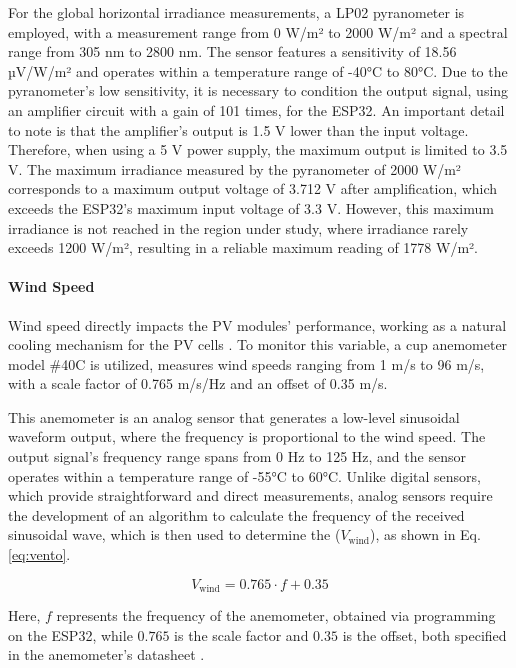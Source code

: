 \documentclass{ieeeaccess}
\begin{document}
For the global horizontal irradiance measurements, a LP02 pyranometer is employed, with a measurement range from 0 W/m² to 2000 W/m² and a spectral range from 305 nm to 2800 nm. The sensor features a sensitivity of 18.56 µV/W/m² and operates within a temperature range of -40°C to 80°C. Due to the pyranometer's low sensitivity, it is necessary to condition the output signal, using an amplifier circuit with a gain of 101 times, for the ESP32.
%
An important detail to note is that the amplifier's output is 1.5 V lower than the input voltage. Therefore, when using a 5 V power supply, the maximum output is limited to 3.5 V. The maximum irradiance measured by the pyranometer of 2000 W/m² corresponds to a maximum output voltage of 3.712 V after amplification, which exceeds the ESP32’s maximum input voltage of 3.3 V. However, this maximum irradiance is not reached in the region under study, where irradiance rarely exceeds 1200 W/m², resulting in a reliable maximum reading of 1778 W/m².


\paragraph{Wind Speed}

Wind speed directly impacts the  PV modules' performance, working as a natural cooling mechanism for the PV cells \cite{neto2021the}. To monitor this variable, a cup anemometer model \#40C is utilized, measures wind speeds ranging from 1 m/s to 96 m/s, with a scale factor of 0.765 m/s/Hz and an offset of 0.35 m/s.

This anemometer is an analog sensor that generates a low-level sinusoidal waveform output, where the frequency is proportional to the wind speed. The output signal's frequency range spans from 0 Hz to 125 Hz, and the sensor operates within a temperature range of -55°C to 60°C. Unlike digital sensors, which provide straightforward and direct measurements, analog sensors require the development of an algorithm to calculate the frequency of the received sinusoidal wave, which is then used to determine the (\(V_{\text{wind}}\)),  as shown in Eq. \ref{eq:vento}.

\begin{equation}
    V_{\text{wind}} = 0.765 \cdot f + 0.35
    \label{eq:vento}
\end{equation}

Here, \(f\) represents the frequency of the anemometer, obtained via programming on the ESP32, while  \(0.765\)  is the scale factor and \(0.35\) is the offset, both specified in the anemometer's datasheet \cite{NRGSystems2019}.
%
\end{document}
